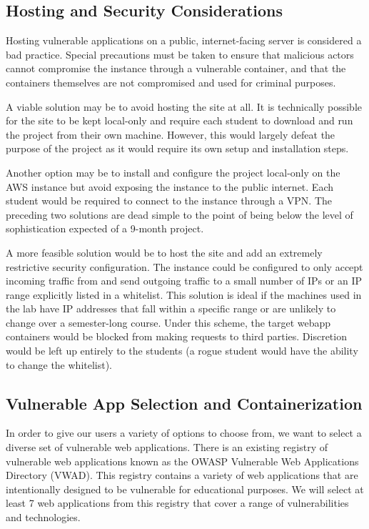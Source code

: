 \documentclass[12pt]{article}
\begin{document}
\subsection{Hosting and Security Considerations}
Hosting vulnerable applications on a public, internet-facing server is considered a bad practice. Special precautions must be taken to ensure that malicious actors cannot compromise the instance through a vulnerable container, and that the containers themselves are not compromised and used for criminal purposes.

A viable solution may be to avoid hosting the site at all. It is technically possible for the site to be kept local-only and require each student to download and run the project from their own machine. However, this would largely defeat the purpose of the project as it would require its own setup and installation steps.

Another option may be to install and configure the project local-only on the AWS instance but avoid exposing the instance to the public internet. Each student would be required to connect to the instance through a VPN. The preceding two solutions are dead simple to the point of being below the level of sophistication expected of a 9-month project.

A more feasible solution would be to host the site and add an extremely restrictive security configuration. The instance could be configured to only accept incoming traffic from and send outgoing traffic to a small number of IPs or an IP range explicitly listed in a whitelist. This solution is ideal if the machines used in the lab have IP addresses that fall within a specific range or are unlikely to change over a semester-long course. Under this scheme, the target webapp containers would be blocked from making requests to third parties. Discretion would be left up entirely to the students (a rogue student would have the ability to change the whitelist).

\subsection{Vulnerable App Selection and Containerization}
In order to give our users a variety of options to choose from, we want to select a diverse set of vulnerable web applications. There is an existing registry of vulnerable web applications known as the OWASP Vulnerable Web Applications Directory (VWAD). This registry contains a variety of web applications that are intentionally designed to be vulnerable for educational purposes. We will select at least 7 web applications from this registry that cover a range of vulnerabilities and technologies.
\end{document}
